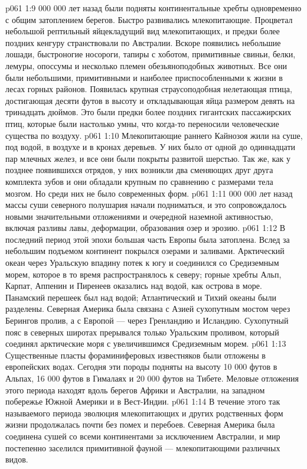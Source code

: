 \vs p061 1:9  000 000 лет назад были подняты континентальные хребты одновременно с общим затоплением берегов. Быстро развивались млекопитающие. Процветал небольшой рептильный яйцекладущий вид млекопитающих, и предки более поздних кенгуру странствовали по Австралии. Вскоре появились небольшие лошади, быстроногие носороги, тапиры с хоботом, примитивные свиньи, белки, лемуры, опоссумы и несколько племен обезьяноподобных животных. Все они были небольшими, примитивными и наиболее приспособленными к жизни в лесах горных районов. Появилась крупная страусоподобная нелетающая птица, достигающая десяти футов в высоту и откладывающая яйца размером девять на тринадцать дюймов. Это были предки более поздних гигантских пассажирских птиц, которые были настолько умны, что когда\hyp{}то переносили человеческие существа по воздуху.
\vs p061 1:10 Млекопитающие раннего Кайнозоя жили на суше, под водой, в воздухе и в кронах деревьев. У них было от одной до одиннадцати пар млечных желез, и все они были покрыты развитой шерстью. Так же, как у позднее появившихся отрядов, у них возникли два сменяющих друг друга комплекта зубов и они обладали крупным по сравнению с размерами тела мозгом. Но среди них не было современных форм.
\vs p061 1:11  000 000 лет назад массы суши северного полушария начали подниматься, и это сопровождалось новыми значительными отложениями и очередной наземной активностью, включая разливы лавы, деформации, образования озер и эрозию.
\vs p061 1:12 В последний период этой эпохи большая часть Европы была затоплена. Вслед за небольшим подъемом континент покрылся озерами и заливами. Арктический океан через Уральскую впадину потек к югу и соединился со Средиземным морем, которое в то время распространялось к северу; горные хребты Альп, Карпат, Аппенин и Пиренеев оказались над водой, как острова в море. Панамский перешеек был над водой; Атлантический и Тихий океаны были разделены. Северная Америка была связана с Азией сухопутным мостом через Берингов пролив, а с Европой --- через Гренландию и Исландию. Сухопутный пояс в северных широтах прерывался только Уральским проливом, который соединял арктические моря с увеличившимся Средиземным морем.
\vs p061 1:13 Существенные пласты фораминиферовых известняков были отложены в европейских водах. Сегодня эти породы подняты на высоту 10 000 футов в Альпах, 16 000 футов в Гималаях и 20 000 футов на Тибете. Меловые отложения этого периода находят вдоль берегов Африки и Австралии, на западном побережье Южной Америки и в Вест\hyp{}Индии.
\vs p061 1:14 \pc В течение этого так называемого  периода эволюция млекопитающих и других родственных форм жизни продолжалась почти без помех и перебоев. Северная Америка была соединена сушей со всеми континентами за исключением Австралии, и мир постепенно заселился примитивной фауной --- млекопитающими различных видов.
